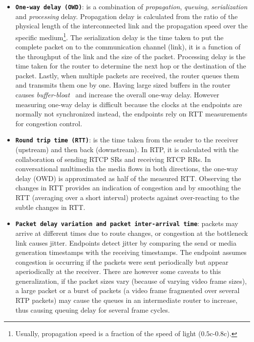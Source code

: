 \begin{itemize}
\item \textbf{\texttt{One-way delay (OWD)}}: is a combination of
\emph{propagation}, \emph{queuing}, \emph{serialization} and \emph{processing}
delay. Propagation delay is calculated from the ratio of the physical length of
the interconnected link and the propagation speed over the specific
medium\footnote{Usually, propagation speed is a fraction of the speed of light
($0.5$c-$0.8$c).}. The serialization delay is the time taken to put the
complete packet on to the communication channel (link), it is a function of
the throughput of the link and the size of the packet. Processing delay is the
time taken for the router to determine the next hop or the destination of the
packet. Lastly, when multiple packets are received, the router queues them and
transmits them one by one. Having large sized buffers in the router causes
\emph{buffer-bloat}~\cite{gettys:bufferbloat} and increase the overall one-way
delay. However measuring one-way delay is difficult because the clocks at the
endpoints are normally not synchronized instead, the endpoints rely on RTT
measurements for congestion control.


\item \textbf{\texttt{Round trip time (RTT)}}: is the time taken from the
sender to the receiver (upstream) and then back (downstream). In RTP, it is
calculated with the collaboration of sending RTCP SRs and receiving RTCP RRs.
In conversational multimedia the media flows in both directions, the one-way
delay (OWD) is approximated as half of the measured RTT. Observing the changes
in RTT provides an indication of congestion and by smoothing the RTT
(averaging over a short interval) protects against over-reacting to the subtle
changes in RTT.

\item \textbf{\texttt{Packet delay variation and packet inter-arrival time}}:
packets may arrive at different times due to route changes, or congestion at
the bottleneck link causes jitter. Endpoints detect jitter by comparing the
send or media generation timestamps with the receiving timestamps. The
endpoint assumes congestion is occurring if the packets were sent periodically
but appear aperiodically at the receiver. There are however some caveats to
this generalization, if the packet sizes vary (because of varying video frame
sizes), a large packet or a burst of packets (a video frame fragmented over
several RTP packets) may cause the queues in an intermediate router to
increase, thus causing queuing delay for several frame cycles.


\end{itemize}

